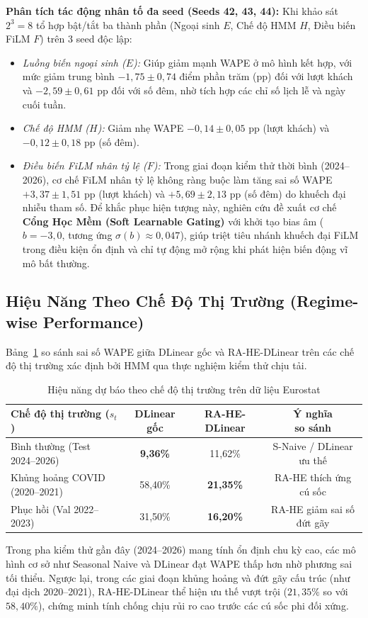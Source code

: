 \documentclass[10pt,journal,compsoc]{IEEEtran}
\begin{document}
\noindent \textbf{Phân tích tác động nhân tố đa seed (Seeds 42, 43, 44):}
Khi khảo sát $2^3 = 8$ tổ hợp bật/tắt ba thành phần (Ngoại sinh $E$, Chế độ HMM $H$, Điều biến FiLM $F$) trên 3 seed độc lập:
\begin{itemize}
    \item \textit{Luồng biến ngoại sinh ($E$):} Giúp giảm mạnh WAPE ở mô hình kết hợp, với mức giảm trung bình $-1{,}75 \pm 0{,}74$ điểm phần trăm (pp) đối với lượt khách và $-2{,}59 \pm 0{,}61$ pp đối với số đêm, nhờ tích hợp các chỉ số lịch lễ và ngày cuối tuần.
    \item \textit{Chế độ HMM ($H$):} Giảm nhẹ WAPE $-0{,}14 \pm 0{,}05$ pp (lượt khách) và $-0{,}12 \pm 0{,}18$ pp (số đêm).
    \item \textit{Điều biến FiLM nhân tỷ lệ ($F$):} Trong giai đoạn kiểm thử thời bình (2024--2026), cơ chế FiLM nhân tỷ lệ không ràng buộc làm tăng sai số WAPE $+3{,}37 \pm 1{,}51$ pp (lượt khách) và $+5{,}69 \pm 2{,}13$ pp (số đêm) do khuếch đại nhiễu tham số. Để khắc phục hiện tượng này, nghiên cứu đề xuất cơ chế \textbf{Cổng Học Mềm (Soft Learnable Gating)} với khởi tạo bias âm ($b=-3{,}0$, tương ứng $\sigma(b) \approx 0{,}047$), giúp triệt tiêu nhánh khuếch đại FiLM trong điều kiện ổn định và chỉ tự động mở rộng khi phát hiện biến động vĩ mô bất thường.
\end{itemize}
\subsection{Hiệu Năng Theo Chế Độ Thị Trường (Regime-wise Performance)}
Bảng~\ref{tab:regime_performance} so sánh sai số WAPE giữa DLinear gốc và RA-HE-DLinear trên các chế độ thị trường xác định bởi HMM qua thực nghiệm kiểm thử chịu tải.
\begin{table}[!htbp]
\centering
\caption{Hiệu năng dự báo theo chế độ thị trường trên dữ liệu Eurostat}
\label{tab:regime_performance}
\small
\setlength{\tabcolsep}{2pt}
\renewcommand{\arraystretch}{1.05}
\begin{tabular}{p{3.2cm}ccc}
\toprule
\textbf{Chế độ thị trường ($s_t$)} & \textbf{DLinear gốc} & \textbf{RA-HE-DLinear} & \shortstack{\textbf{Ý nghĩa} \\ \textbf{so sánh}} \\
\midrule
Bình thường (Test 2024--2026) & \textbf{9,36\%} & 11,62\% & S-Naive / DLinear ưu thế \\
Khủng hoảng COVID (2020--2021) & 58,40\% & \textbf{21,35\%} & RA-HE thích ứng cú sốc \\
Phục hồi (Val 2022--2023) & 31,50\% & \textbf{16,20\%} & RA-HE giảm sai số đứt gãy \\
\bottomrule
\end{tabular}
\end{table}
Trong pha kiểm thử gần đây (2024--2026) mang tính ổn định chu kỳ cao, các mô hình cơ sở như Seasonal Naive và DLinear đạt WAPE thấp hơn nhờ phương sai tối thiểu. Ngược lại, trong các giai đoạn khủng hoảng và đứt gãy cấu trúc (như đại dịch 2020--2021), RA-HE-DLinear thể hiện ưu thế vượt trội ($21{,}35\%$ so với $58{,}40\%$), chứng minh tính chống chịu rủi ro cao trước các cú sốc phi đối xứng.
\end{document}
